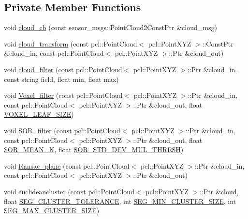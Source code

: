 \subsection*{Private Member Functions}
\begin{DoxyCompactItemize}
\item 
void \hyperlink{classdatmo_1_1cloud__segmentation_a9fb8b8321055b7798ce62d1cd9416642}{cloud\+\_\+cb} (const sensor\+\_\+msgs\+::\+Point\+Cloud2\+Const\+Ptr \&cloud\+\_\+msg)
\item 
void \hyperlink{classdatmo_1_1cloud__segmentation_a3e3bd9d1b4a99da4bcd81ebac95f83fe}{cloud\+\_\+transform} (const pcl\+::\+Point\+Cloud$<$ pcl\+::\+Point\+X\+YZ $>$\+::Const\+Ptr \&cloud\+\_\+in, const pcl\+::\+Point\+Cloud$<$ pcl\+::\+Point\+X\+YZ $>$\+::Ptr \&cloud\+\_\+out)
\item 
void \hyperlink{classdatmo_1_1cloud__segmentation_afa29d45018811393b160e64b1f972289}{cloud\+\_\+filter} (const pcl\+::\+Point\+Cloud$<$ pcl\+::\+Point\+X\+YZ $>$\+::Ptr \&cloud\+\_\+in, const string field, float min, float max)
\item 
void \hyperlink{classdatmo_1_1cloud__segmentation_acb0e7e196b28d7d62fe73d7437e629dc}{Voxel\+\_\+filter} (const pcl\+::\+Point\+Cloud$<$ pcl\+::\+Point\+X\+YZ $>$\+::Ptr \&cloud\+\_\+in, const pcl\+::\+Point\+Cloud$<$ pcl\+::\+Point\+X\+YZ $>$\+::Ptr \&cloud\+\_\+out, float \hyperlink{classdatmo_1_1cloud__segmentation_af6f1f8553f2a18176ae84b78ddea07c9}{V\+O\+X\+E\+L\+\_\+\+L\+E\+A\+F\+\_\+\+S\+I\+ZE})
\item 
void \hyperlink{classdatmo_1_1cloud__segmentation_a169ebef33c020301b83261ee2d3f49df}{S\+O\+R\+\_\+filter} (const pcl\+::\+Point\+Cloud$<$ pcl\+::\+Point\+X\+YZ $>$\+::Ptr \&cloud\+\_\+in, const pcl\+::\+Point\+Cloud$<$ pcl\+::\+Point\+X\+YZ $>$\+::Ptr \&cloud\+\_\+out, float \hyperlink{classdatmo_1_1cloud__segmentation_abb5b1262c14e68886e01e0230c530b07}{S\+O\+R\+\_\+\+M\+E\+A\+N\+\_\+K}, float \hyperlink{classdatmo_1_1cloud__segmentation_ae1c32b9f5741dd7d212f2745f8784de0}{S\+O\+R\+\_\+\+S\+T\+D\+\_\+\+D\+E\+V\+\_\+\+M\+U\+L\+\_\+\+T\+H\+R\+E\+SH})
\item 
void \hyperlink{classdatmo_1_1cloud__segmentation_a168514d0652e6ada8a371604470b98ed}{Ransac\+\_\+plane} (const pcl\+::\+Point\+Cloud$<$ pcl\+::\+Point\+X\+YZ $>$\+::Ptr \&cloud\+\_\+in, const pcl\+::\+Point\+Cloud$<$ pcl\+::\+Point\+X\+YZ $>$\+::Ptr \&cloud\+\_\+out)
\item 
void \hyperlink{classdatmo_1_1cloud__segmentation_a7506a589048c71ab56a49d6470591ef1}{euclideancluster} (const pcl\+::\+Point\+Cloud$<$ pcl\+::\+Point\+X\+YZ $>$\+::Ptr \&cloud, float \hyperlink{classdatmo_1_1cloud__segmentation_af33add7f3b00fac5be10ffd87eae057f}{S\+E\+G\+\_\+\+C\+L\+U\+S\+T\+E\+R\+\_\+\+T\+O\+L\+E\+R\+A\+N\+CE}, int \hyperlink{classdatmo_1_1cloud__segmentation_acf7cfcaf0ab08a2afffcc2b47048bc81}{S\+E\+G\+\_\+\+M\+I\+N\+\_\+\+C\+L\+U\+S\+T\+E\+R\+\_\+\+S\+I\+ZE}, int \hyperlink{classdatmo_1_1cloud__segmentation_ab2959ad226faeaab4910f42ba91d37cb}{S\+E\+G\+\_\+\+M\+A\+X\+\_\+\+C\+L\+U\+S\+T\+E\+R\+\_\+\+S\+I\+ZE})

\end{DoxyCompactItemize}
